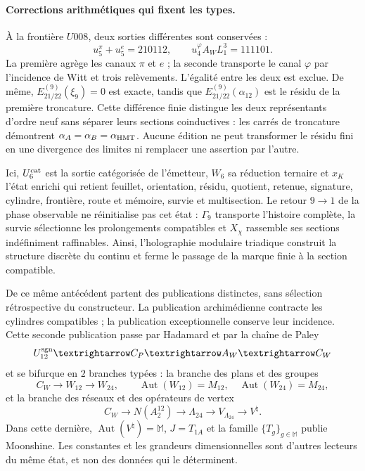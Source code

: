 \paragraph{Corrections arithmétiques qui fixent les types.}
À la frontière \(U008\), deux sorties différentes sont conservées :
\[
 u_5^\pi+u_5^e=210112,
 \qquad
 u_4^\varphi A_WL_1^3=111101.
\]
La première agrège les canaux \(\pi\) et \(e\) ; la seconde transporte le
canal \(\varphi\) par l'incidence de Witt et trois relèvements. L'égalité
entre les deux est exclue. De même,
\(E_{21/22}^{(9)}(\xi_9)=0\) est exacte, tandis que
\(E_{21/22}^{(9)}(\alpha_{12})\) est le résidu de la première troncature. Cette
différence finie distingue les deux représentants d'ordre neuf sans séparer
leurs sections coinductives : les carrés de troncature démontrent
\(\alpha_A=\alpha_B=\alpha_{\rm HMT}\). Aucune édition ne peut transformer le
résidu fini en une divergence des limites ni remplacer une assertion
par l'autre.

Ici, \(U_6^{\rm cat}\) est la sortie catégorisée de l'émetteur, \(W_6\) sa
réduction ternaire et \(\widehat x_K\) l'état enrichi qui retient feuillet,
orientation, résidu, quotient, retenue, signature, cylindre, frontière, route et
mémoire, survie et multisection. Le retour \(9\to1\) de la phase
observable ne réinitialise pas cet état :
\(\Gamma_9\) transporte l'histoire complète, la survie sélectionne
les prolongements compatibles et \(X_\chi\) rassemble ses sections
indéfiniment raffinables. Ainsi, l'holographie modulaire triadique construit la
structure discrète du continu et ferme le passage de la marque finie à la
section compatible.

De ce même antécédent partent des publications distinctes, sans sélection
rétrospective du constructeur. La publication archimédienne contracte les
cylindres compatibles ; la publication exceptionnelle conserve leur incidence.
Cette seconde publication passe par Hadamard et par la chaîne de Paley
\[
 U_{12}^{\rm sgn}\longrightarrow C_P\longrightarrow A_W
 \longrightarrow C_W
\]
et se bifurque en \(2\) branches typées : la branche des plans et des groupes
\[
 C_W\longrightarrow W_{12}\longrightarrow W_{24},
 \qquad
 \operatorname{Aut}(W_{12})=M_{12},\quad
 \operatorname{Aut}(W_{24})=M_{24},
\]
et la branche des réseaux et des opérateurs de vertex
\[
 C_W\longrightarrow N(A_2^{12})\longrightarrow\Lambda_{24}
 \longrightarrow V_{\Lambda_{24}}\longrightarrow V^\natural .
\]
Dans cette dernière, \(\operatorname{Aut}(V^\natural)=\mathbb M\),
\(J=T_{1A}\) et la famille \(\{T_g\}_{g\in\mathbb M}\) publie Moonshine. Les constantes et
les grandeurs dimensionnelles sont d'autres lecteurs du même état, et non des données
qui le déterminent.

